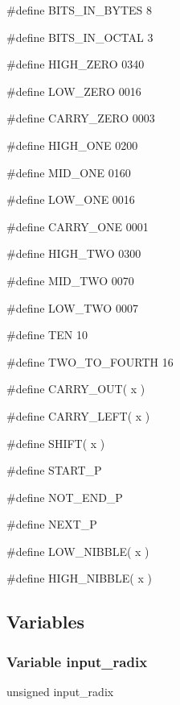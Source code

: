 \medskip
{\stt \#define BITS\_IN\_BYTES 8}

\medskip
{\stt \#define BITS\_IN\_OCTAL 3}

\medskip
{\stt \#define HIGH\_ZERO 0340}

\medskip
{\stt \#define LOW\_ZERO 0016}

\medskip
{\stt \#define CARRY\_ZERO 0003}

\medskip
{\stt \#define HIGH\_ONE 0200}

\medskip
{\stt \#define MID\_ONE 0160}

\medskip
{\stt \#define LOW\_ONE 0016}

\medskip
{\stt \#define CARRY\_ONE 0001}

\medskip
{\stt \#define HIGH\_TWO 0300}

\medskip
{\stt \#define MID\_TWO 0070}

\medskip
{\stt \#define LOW\_TWO 0007}

\medskip
{\stt \#define TEN 10}

\medskip
{\stt \#define TWO\_TO\_FOURTH 16}

\medskip
{\stt \#define CARRY\_OUT( x )}

\medskip
{\stt \#define CARRY\_LEFT( x )}

\medskip
{\stt \#define SHIFT( x )}

\medskip
{\stt \#define START\_P}

\medskip
{\stt \#define NOT\_END\_P}

\medskip
{\stt \#define NEXT\_P}

\medskip
{\stt \#define LOW\_NIBBLE( x )}

\medskip
{\stt \#define HIGH\_NIBBLE( x )}


\subsection{Variables}


\subsubsection{Variable input\_radix}
\label{var_input_radix_valprint.c}

{\stt unsigned input\_radix}

